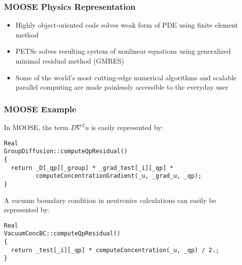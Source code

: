 \begin{frame}
\frametitle{MOOSE Physics Representation}
  \begin{itemize}
      \item{Highly object-oriented code solves weak form of PDE using finite element method}
      \item{PETSc solves resulting system of nonlinear equations using generalized minimal residual method (GMRES)}
      \item{Some of the world's most cutting-edge numerical algorithms and scalable parallel computing are made painlessly accessible to the everyday user}
	\end{itemize}

\end{frame}

\begin{frame}[fragile]
    \frametitle{MOOSE Example}
    In MOOSE, the term $D \nabla^2 u$ is easily represented by:
  \begin{verbatim}
Real
GroupDiffusion::computeQpResidual()
{
  return _D[_qp][_group] * _grad_test[_i][_qp] *
         computeConcentrationGradient(_u, _grad_u, _qp);
}

  \end{verbatim}

  A vacuum boundary condition in neutronics calculations can easily be represented by:
  \begin{verbatim}
Real
VacuumConcBC::computeQpResidual()
{
  return _test[_i][_qp] * computeConcentration(_u, _qp) / 2.;
}
  \end{verbatim}

\end{frame}
